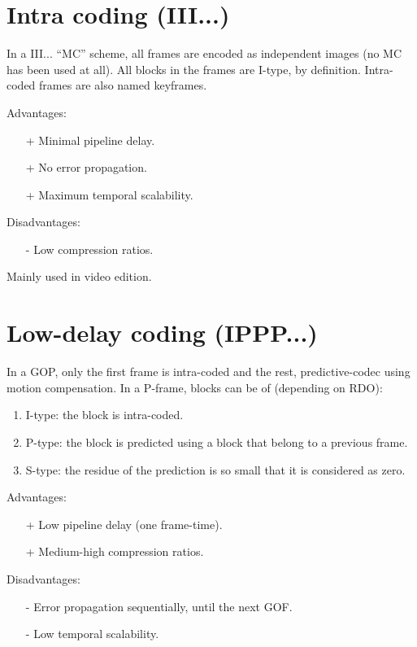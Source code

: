 \section{Intra coding (III...)}

In a III... ``MC'' scheme, all frames are encoded as independent
images (no MC has been used at all). All blocks in the frames are
I-type, by definition. Intra-coded frames are also named keyframes.

Advantages:
\begin{itemize}
\item [+] Minimal pipeline delay.
\item [+] No error propagation.
\item [+] Maximum temporal scalability.
\end{itemize}

Disadvantages:
\begin{enumerate}
\item [-] Low compression ratios.
\end{enumerate}

Mainly used in video edition.

\section{Low-delay coding (IPPP...)}

In a GOP, only the first frame is intra-coded and the rest,
predictive-codec using motion compensation. In a P-frame, blocks can
be of (depending on RDO):
\begin{enumerate}
\item I-type: the block is intra-coded.
\item P-type: the block is predicted using a block that belong to a previous frame.
\item S-type: the residue of the prediction is so small that it is considered as zero.
\end{enumerate}

Advantages:
\begin{itemize}
\item [+] Low pipeline delay (one frame-time).
\item [+] Medium-high compression ratios.
\end{itemize}

Disadvantages:
\begin{enumerate}
\item [-] Error propagation sequentially, until the next GOF.
\item [-] Low temporal scalability.
\end{enumerate}

